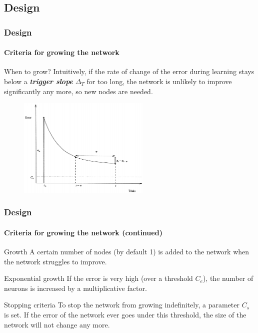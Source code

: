 \documentclass{beamer}
\begin{document}
		
		\subsection{Design}
			\begin{frame}
				\frametitle{Design}
				\framesubtitle{Criteria for growing the network}
				\begin{block}{When to grow?}
					Intuitively, if the rate of change of the error during learning stays below a \emph{\textbf{trigger slope}} $\Delta_T$ for too long, the network is unlikely to improve significantly any more, so new nodes are needed.
				\end{block}
				\begin{figure}[h]
					\centering
					\includegraphics[width=0.56\textwidth]{error}
				\end{figure}
			\end{frame}

			\begin{frame}
				\frametitle{Design}
				\framesubtitle{Criteria for growing the network (continued)}
				\begin{block}{Growth}
					A certain number of nodes (by default 1) is added to the network when the network struggles to improve.
				\end{block}
				\begin{exampleblock}{Exponential growth}
					If the error is very high (over a threshold $C_e$), the number of neurons is increased by a multiplicative factor.
				\end{exampleblock}
				\begin{alertblock}{Stopping criteria}
					To stop the network from growing indefinitely, a parameter $C_s$ is set. If the error of the network ever goes under this threshold, the size of the network will not change any more.
				\end{alertblock}
			\end{frame}
\end{document}
